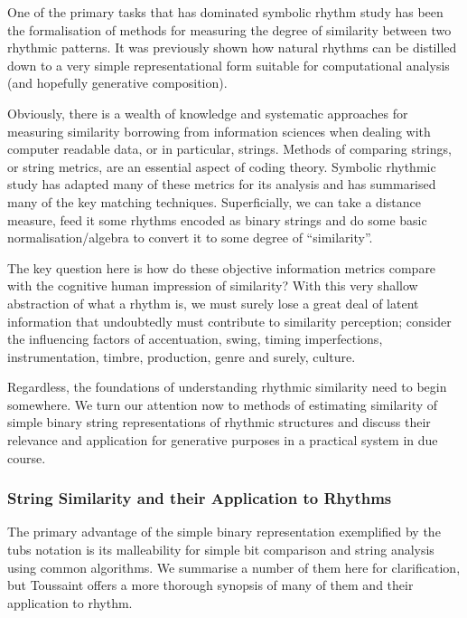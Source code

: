 One of the primary tasks that has dominated symbolic rhythm study has been the formalisation of methods for measuring the degree of similarity between two rhythmic patterns. It was previously shown how natural rhythms can be distilled down to a very simple representational form suitable for computational analysis (and hopefully generative composition).

Obviously, there is a wealth of knowledge and systematic approaches for measuring similarity borrowing from information sciences when dealing with computer readable data, or in particular, strings. Methods of comparing strings, or string metrics, are an essential aspect of coding theory. Symbolic rhythmic study has adapted many of these metrics for its analysis and \cite{Toussaint2004} has summarised many of the key matching techniques. Superficially, we can take a distance measure, feed it some rhythms encoded as binary strings and do some basic normalisation/algebra to convert it to some degree of “similarity”.

The key question here is how do these objective information metrics compare with the cognitive human impression of similarity? With this very shallow abstraction of what a rhythm is, we must surely lose a great deal of latent information that undoubtedly must contribute to similarity perception; consider the influencing factors of accentuation, swing, timing imperfections, instrumentation, timbre, production, genre and surely, culture. 

Regardless, the foundations of understanding rhythmic similarity need to begin somewhere. We turn our attention now to methods of estimating similarity of simple binary string representations of rhythmic structures and discuss their relevance and application for generative purposes in a practical system in due course.

\subsubsection{String Similarity and their Application to Rhythms}

\label{sec:distance_measures}

The primary advantage of the simple binary representation exemplified by the \acrshort{tubs} notation is its malleability for simple bit comparison and string analysis using common algorithms. We summarise a number of them here for clarification, but Toussaint  offers a more thorough synopsis of many of them and their application to rhythm.

